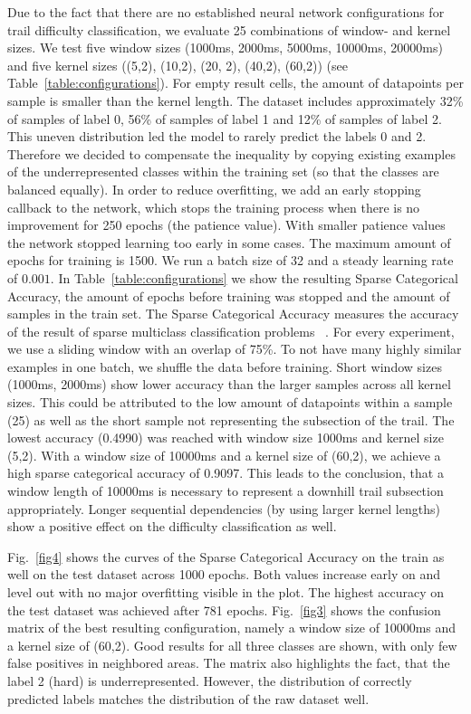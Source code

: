 \documentclass[runningheads]{llncs}
\begin{document}
Due to the fact that there are no established neural network configurations for trail difficulty classification, we evaluate 25 combinations of window- and kernel sizes.
We test five window sizes (1000ms, 2000ms, 5000ms, 10000ms, 20000ms) and five kernel sizes ((5,2), (10,2), (20, 2), (40,2), (60,2)) (see Table~\ref{table:configurations}).
For empty result cells, the amount of datapoints per sample is smaller than the kernel length.
The dataset includes approximately 32\% of samples of label 0, 56\% of samples of label 1 and 12\% of samples of label 2.
This uneven distribution led the model to rarely predict the labels 0 and 2.
Therefore we decided to compensate the inequality by copying existing examples of the underrepresented classes within the training set (so that the classes are balanced equally).
In order to reduce overfitting, we add an early stopping callback to the network, which stops the training process when there is no improvement for 250 epochs (the patience value).
With smaller patience values the network stopped learning too early in some cases.
The maximum amount of epochs for training is 1500.
We run a batch size of 32 and a steady learning rate of $0.001$.
In Table~\ref{table:configurations} we show the resulting Sparse Categorical Accuracy, the amount of epochs before training was stopped and the amount of samples in the train set.
The Sparse Categorical Accuracy measures the accuracy of the result of sparse multiclass classification problems ~\cite{moolayil2019keras}.
For every experiment, we use a sliding window with an overlap of 75\%.
To not have many highly similar examples in one batch, we shuffle the data before training.
Short window sizes (1000ms, 2000ms) show lower accuracy than the larger samples across all kernel sizes.
This could be attributed to the low amount of datapoints within a sample (25) as well as the short sample not representing the subsection of the trail.
The lowest accuracy (0.4990) was reached with window size 1000ms and kernel size (5,2).
With a window size of 10000ms and a kernel size of (60,2), we achieve a high sparse categorical accuracy of 0.9097.
This leads to the conclusion, that a window length of 10000ms is necessary to represent a downhill trail subsection appropriately.
Longer sequential dependencies (by using larger kernel lengths) show a positive effect on the difficulty classification as well.

Fig.~\ref{fig4} shows the curves of the Sparse Categorical Accuracy on the train as well on the test dataset across 1000 epochs.
Both values increase early on and level out with no major overfitting visible in the plot.
The highest accuracy on the test dataset was achieved after 781 epochs.
Fig.~\ref{fig3} shows the confusion matrix of the best resulting configuration, namely a window size of 10000ms and a kernel size of (60,2).
Good results for all three classes are shown, with only few false positives in neighbored areas. 
The matrix also highlights the fact, that the label 2 (hard) is underrepresented.
However, the distribution of correctly predicted labels matches the distribution of the raw dataset well.
\end{document}
